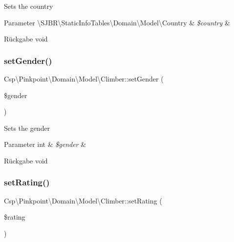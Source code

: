 Sets the country


\begin{DoxyParams}[1]{Parameter}
\textbackslash{}\+S\+J\+B\+R\textbackslash{}\+Static\+Info\+Tables\textbackslash{}\+Domain\textbackslash{}\+Model\textbackslash{}\+Country & {\em \$country} & \\
\hline
\end{DoxyParams}
\begin{DoxyReturn}{Rückgabe}
void 
\end{DoxyReturn}
\mbox{\label{classCsp_1_1Pinkpoint_1_1Domain_1_1Model_1_1Climber_a0a9d3b7fe2799d35d7027d568de56b73}} 
\subsubsection{\texorpdfstring{set\+Gender()}{setGender()}}
{\footnotesize\ttfamily Csp\textbackslash{}\+Pinkpoint\textbackslash{}\+Domain\textbackslash{}\+Model\textbackslash{}\+Climber\+::set\+Gender (\begin{DoxyParamCaption}\item[{}]{\$gender }\end{DoxyParamCaption})}

Sets the gender


\begin{DoxyParams}[1]{Parameter}
int & {\em \$gender} & \\
\hline
\end{DoxyParams}
\begin{DoxyReturn}{Rückgabe}
void 
\end{DoxyReturn}
\mbox{\label{classCsp_1_1Pinkpoint_1_1Domain_1_1Model_1_1Climber_a603f3c42f7ae8ccff1b871d54e2b86dd}} 
\subsubsection{\texorpdfstring{set\+Rating()}{setRating()}}
{\footnotesize\ttfamily Csp\textbackslash{}\+Pinkpoint\textbackslash{}\+Domain\textbackslash{}\+Model\textbackslash{}\+Climber\+::set\+Rating (\begin{DoxyParamCaption}\item[{\textbackslash{}\hyperlink{classCsp_1_1Pinkpoint_1_1Domain_1_1Model_1_1RouteRating}{Csp\textbackslash{}\+Pinkpoint\textbackslash{}\+Domain\textbackslash{}\+Model\textbackslash{}\+Route\+Rating}}]{\$rating }\end{DoxyParamCaption})}


